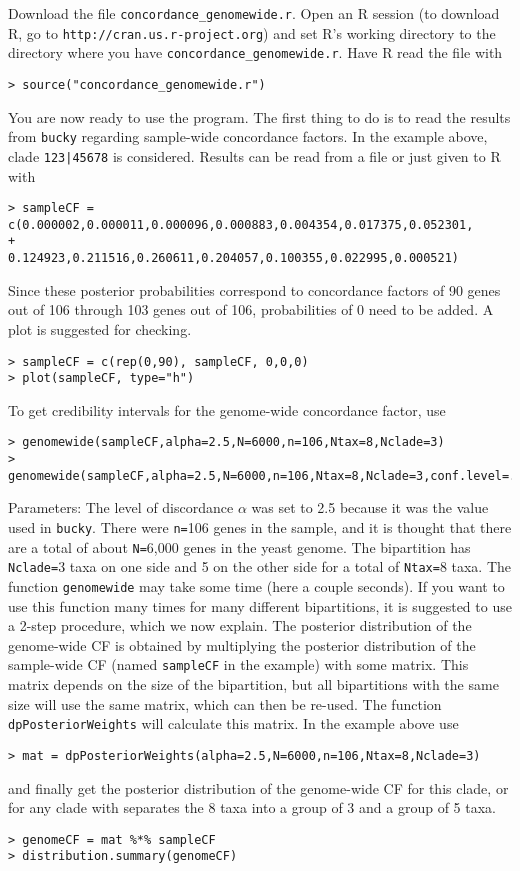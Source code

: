 \documentclass[12pt,english,final,letterpaper]{article}
\begin{document}
{Download the file {\tt concordance\_genomewide.r}.
Open an R session (to download R, go to 
\verb+http://cran.us.r-project.org+) and set R's working directory to the
directory where you have {\tt concordance\_genomewide.r}. Have
R read the file with
\begin{verbatim}
> source("concordance_genomewide.r")
\end{verbatim}
You are now ready to use the program. The first thing to do is to read
the results from {\tt bucky} regarding sample-wide concordance factors.
In the example above, clade {\tt 123|45678} is considered. 
Results can be read from a file or just given to R with
\begin{verbatim}
> sampleCF = c(0.000002,0.000011,0.000096,0.000883,0.004354,0.017375,0.052301,
+              0.124923,0.211516,0.260611,0.204057,0.100355,0.022995,0.000521)
\end{verbatim}
Since these posterior probabilities correspond to concordance factors of
90 genes out of 106 through 103 genes out of 106, probabilities of 0 need
to be added. A plot is suggested for checking.
\begin{verbatim}
> sampleCF = c(rep(0,90), sampleCF, 0,0,0)
> plot(sampleCF, type="h")
\end{verbatim}
To get credibility intervals for the genome-wide concordance factor, use
\begin{verbatim}
> genomewide(sampleCF,alpha=2.5,N=6000,n=106,Ntax=8,Nclade=3)
> genomewide(sampleCF,alpha=2.5,N=6000,n=106,Ntax=8,Nclade=3,conf.level=.99)
\end{verbatim}
Parameters: The level of discordance
$\alpha$ was set to 2.5 because it was the value used in {\tt bucky}.
There were {\tt n=}106 genes in the sample, and it is thought that there are a 
total of about {\tt N=}6,000 genes in the yeast genome.
The bipartition has {\tt Nclade=}3 taxa on one side and 5 on the other side 
for a total of {\tt Ntax=}8 taxa.
The function {\tt genomewide} may take some time (here a couple seconds). 
If you want to use this function many times for many different bipartitions,
it is suggested to use a 2-step procedure, which we now explain.
The posterior distribution of the genome-wide CF 
is obtained by multiplying the posterior distribution of the sample-wide 
CF (named {\tt sampleCF} in the example) with some matrix.
This matrix depends on the size of the bipartition, but all bipartitions 
with the same size will use the same matrix, which can then be re-used. 
The function {\tt dpPosteriorWeights} will calculate this matrix.
In the example above use
\begin{verbatim}
> mat = dpPosteriorWeights(alpha=2.5,N=6000,n=106,Ntax=8,Nclade=3)
\end{verbatim}
and finally get the posterior distribution of the genome-wide CF for this
clade, or for any clade with separates the 8 taxa into a group of 3 and 
a group of 5 taxa.
\begin{verbatim}
> genomeCF = mat %*% sampleCF
> distribution.summary(genomeCF)
\end{verbatim}
}


\end{document}
